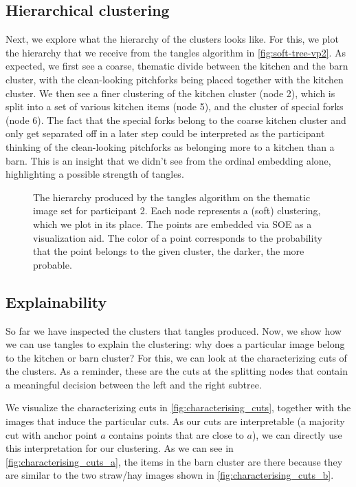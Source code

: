 \FloatBarrier
\subsection{Hierarchical clustering}
Next, we explore what the hierarchy of the clusters looks like.
For this, we plot the hierarchy that we receive from the tangles algorithm in \autoref{fig:soft-tree-vp2}. 
As expected, we first see a coarse, thematic divide between the kitchen and the barn cluster, with 
the clean-looking pitchforks being placed together with the kitchen cluster. 
We then see a finer clustering of the kitchen cluster (node 2), which is split into a set of various kitchen items (node 5), and the cluster of special forks (node 6). 
The fact that the special forks belong to the coarse kitchen cluster and only get separated off in a later step could be interpreted as the participant thinking of the 
clean-looking pitchforks as belonging more to a kitchen than a barn. This is an insight that we didn't see from the ordinal embedding alone,
highlighting a possible strength of tangles.

\begin{figure}[ht]
    \centering
    \caption{
        The hierarchy produced by the tangles algorithm on the thematic image set for participant 2. 
        Each node represents a (soft) clustering, which we plot in its place. The points are embedded via SOE as a visualization aid.
        The color of a point corresponds to the probability that the point belongs to the given cluster, the darker, the more probable. 
    }
    \label{fig:soft-tree-vp2}
\end{figure}

\FloatBarrier
\subsection{Explainability}
So far we have inspected the clusters that tangles produced. Now, we show how we can use tangles to explain the clustering:
why does a particular image belong to the kitchen or barn cluster? For this, we can look at the characterizing cuts of the clusters. As a reminder, 
these are the cuts at the splitting nodes that contain a meaningful decision between the left and the right subtree.

We visualize the characterizing cuts in \autoref{fig:characterising_cuts}, together with the images that induce the particular cuts. As our cuts are interpretable (a majority cut 
with anchor point $a$ contains points that are close to $a$), we can directly use this interpretation for our clustering. As we can see in \autoref{fig:characterising_cuts_a}, 
the items in the barn cluster are there because they are similar to the two straw/hay images shown in \autoref{fig:characterising_cuts_b}. 

